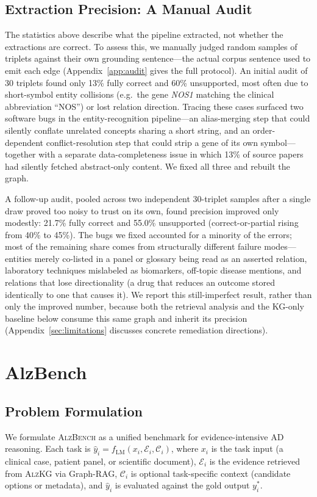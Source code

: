 \documentclass{article}
\begin{document}
\subsection{Extraction Precision: A Manual Audit}
\label{sec:kg-audit}
The statistics above describe what the pipeline extracted, not whether the extractions are correct. To assess this, we manually judged random samples of triplets against their own grounding sentence---the actual corpus sentence used to emit each edge (Appendix~\ref{app:audit} gives the full protocol). An initial audit of 30 triplets found only 13\% fully correct and 60\% unsupported, most often due to short-symbol entity collisions (e.g.\ the gene \textit{NOS1} matching the clinical abbreviation ``NOS'') or lost relation direction. Tracing these cases surfaced two software bugs in the entity-recognition pipeline---an alias-merging step that could silently conflate unrelated concepts sharing a short string, and an order-dependent conflict-resolution step that could strip a gene of its own symbol---together with a separate data-completeness issue in which 13\% of source papers had silently fetched abstract-only content. We fixed all three and rebuilt the graph.

A follow-up audit, pooled across two independent 30-triplet samples after a single draw proved too noisy to trust on its own, found precision improved only modestly: 21.7\% fully correct and 55.0\% unsupported (correct-or-partial rising from 40\% to 45\%). The bugs we fixed accounted for a minority of the errors; most of the remaining share comes from structurally different failure modes---entities merely co-listed in a panel or glossary being read as an asserted relation, laboratory techniques mislabeled as biomarkers, off-topic disease mentions, and relations that lose directionality (a drug that reduces an outcome stored identically to one that causes it). We report this still-imperfect result, rather than only the improved number, because both the retrieval analysis and the KG-only baseline below consume this same graph and inherit its precision (Appendix~\ref{sec:limitations} discusses concrete remediation directions).

\section{AlzBench}

\subsection{Problem Formulation}
We formulate \textsc{AlzBench} as a unified benchmark for evidence-intensive AD reasoning. Each task is $\hat{y}_i = f_{\text{LM}}(x_i, \mathcal{E}_i, \mathcal{C}_i)$, where $x_i$ is the task input (a clinical case, patient panel, or scientific document), $\mathcal{E}_i$ is the evidence retrieved from \textsc{AlzKG} via Graph-RAG, $\mathcal{C}_i$ is optional task-specific context (candidate options or metadata), and $\hat{y}_i$ is evaluated against the gold output $y_i^\ast$.
\end{document}

